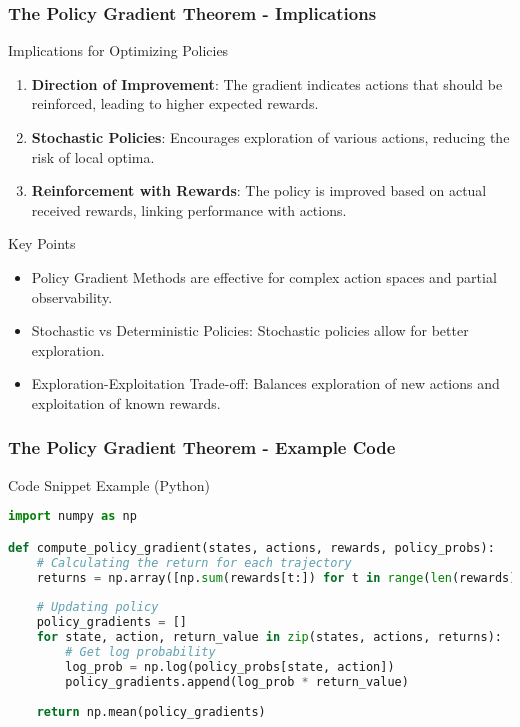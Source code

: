 \documentclass[aspectratio=169]{beamer}
\begin{document}
\begin{frame}[fragile]
    \frametitle{The Policy Gradient Theorem - Implications}
    \begin{block}{Implications for Optimizing Policies}
        \begin{enumerate}
            \item \textbf{Direction of Improvement}: The gradient indicates actions that should be reinforced, leading to higher expected rewards.
            \item \textbf{Stochastic Policies}: Encourages exploration of various actions, reducing the risk of local optima.
            \item \textbf{Reinforcement with Rewards}: The policy is improved based on actual received rewards, linking performance with actions.
        \end{enumerate}
    \end{block}
    
    \begin{block}{Key Points}
        \begin{itemize}
            \item Policy Gradient Methods are effective for complex action spaces and partial observability.
            \item Stochastic vs Deterministic Policies: Stochastic policies allow for better exploration.
            \item Exploration-Exploitation Trade-off: Balances exploration of new actions and exploitation of known rewards.
        \end{itemize}
    \end{block}
\end{frame}

\begin{frame}[fragile]
    \frametitle{The Policy Gradient Theorem - Example Code}
    \begin{block}{Code Snippet Example (Python)}
        \begin{lstlisting}[language=Python]
import numpy as np

def compute_policy_gradient(states, actions, rewards, policy_probs):
    # Calculating the return for each trajectory
    returns = np.array([np.sum(rewards[t:]) for t in range(len(rewards))])
    
    # Updating policy
    policy_gradients = []
    for state, action, return_value in zip(states, actions, returns):
        # Get log probability 
        log_prob = np.log(policy_probs[state, action])
        policy_gradients.append(log_prob * return_value)
    
    return np.mean(policy_gradients)
        \end{lstlisting}
    \end{block}
\end{frame}
\end{document}
